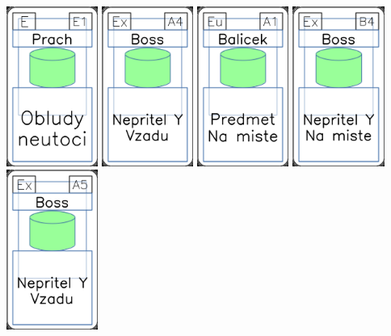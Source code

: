 \documentclass[a4paper]{article}
\begin{document}
	\includegraphics[width=3.0cm]{img-4_50}
	\includegraphics[width=3.0cm]{img-4_3}
	\includegraphics[width=3.0cm]{img-4_30}
	\includegraphics[width=3.0cm]{img-4_8}
	\includegraphics[width=3.0cm]{img-4_4}
\end{document}
